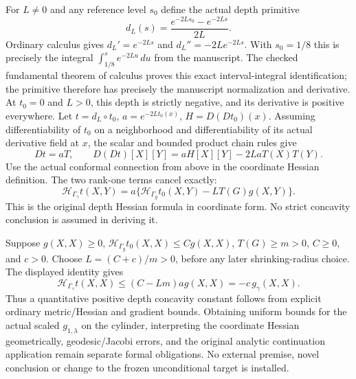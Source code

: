 \documentclass[11pt]{article}
\theoremstyle{definition}
\theoremstyle{remark}
\numberwithin{equation}{section}
\begin{document}
For $L\ne0$ and any reference level $s_0$ define the actual depth primitive
\[
 d_L(s)=\frac{e^{-2Ls_0}-e^{-2Ls}}{2L}.
\]
Ordinary calculus gives $d_L'=e^{-2Ls}$ and $d_L''=-2Le^{-2Ls}$. With $s_0=1/8$ this is precisely the integral $\int_{1/8}^s e^{-2Lu}\,du$ from the manuscript. The checked fundamental theorem of calculus proves this exact interval-integral identification; the primitive therefore has precisely the manuscript normalization and derivative. At $t_0=0$ and $L>0$, this depth is strictly negative, and its derivative is positive everywhere.
Let $t=d_L\circ t_0$, $a=e^{-2Lt_0(x)}$, $H=D(Dt_0)(x)$. Assuming differentiability of $t_0$ on a neighborhood and differentiability of its actual derivative field at $x$, the scalar and bounded product chain rules give
\[
 Dt=aT,\qquad D(Dt)[X][Y]=aH[X][Y]-2LaT(X)T(Y).
\]
Use the actual conformal connection from above in the coordinate Hessian definition. The two rank-one terms cancel exactly:
\[
 \mathcal H_{\Gamma_\gamma}t(X,Y)
 =a\{\mathcal H_{\Gamma_g}t_0(X,Y)-L T(G)g(X,Y)\}.
\]
This is the original depth Hessian formula in coordinate form. No strict concavity conclusion is assumed in deriving it.

Suppose $g(X,X)\ge0$, $\mathcal H_{\Gamma_g}t_0(X,X)\le Cg(X,X)$,
$T(G)\ge m>0$, $C\ge0$, and $c>0$. Choose $L=(C+c)/m>0$, before any later shrinking-radius choice. The displayed identity gives
\[
 \mathcal H_{\Gamma_\gamma}t(X,X)
 \le (C-Lm)ag(X,X)=-c\,g_\gamma(X,X).
\]
Thus a quantitative positive depth concavity constant follows from explicit ordinary metric/Hessian and gradient bounds. Obtaining uniform bounds for the actual scaled $g_{1,\lambda}$ on the cylinder, interpreting the coordinate Hessian geometrically, geodesic/Jacobi errors, and the original analytic continuation application remain separate formal obligations. No external premise, novel conclusion or change to the frozen unconditional target is installed.

\clearpage
\end{document}
